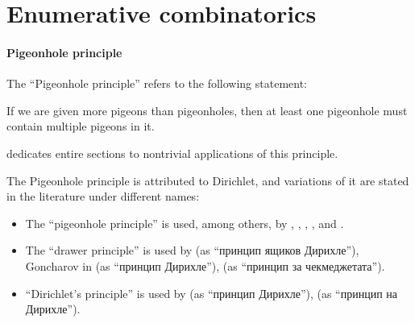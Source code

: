 \section{Enumerative combinatorics}\label{sec:enumerative_combinatorics}

\paragraph{Pigeonhole principle}

\begin{remark}\label{rem:pigeonhole_principle}
  The \enquote{Pigeonhole principle} refers to the following statement:
  \begin{displayquote}
    If we are given more pigeons than pigeonholes, then at least one pigeonhole must contain multiple pigeons in it.
  \end{displayquote}

   dedicates entire sections to nontrivial applications of this principle.

  The Pigeonhole principle is attributed to Dirichlet, and variations of it are stated in the literature under different names:
  \begin{itemize}
    \item The \enquote{pigeonhole principle} is used, among others, by , , , ,  and .
    \item The \enquote{drawer principle} is used by  (as \enquote{принцип ящиков Дирихле}), Goncharov in \cite[156]{АлександровМаркушевичХинчин1952ЭнциклопедияТом3} (as \enquote{принцип Дирихле}),  (as \enquote{принцип за чекмеджетата}).
    \item \enquote{Dirichlet's principle} is used by  (as \enquote{принцип Дирихле}),  (as \enquote{принцип на Дирихле}).
  \end{itemize}
\end{remark}

